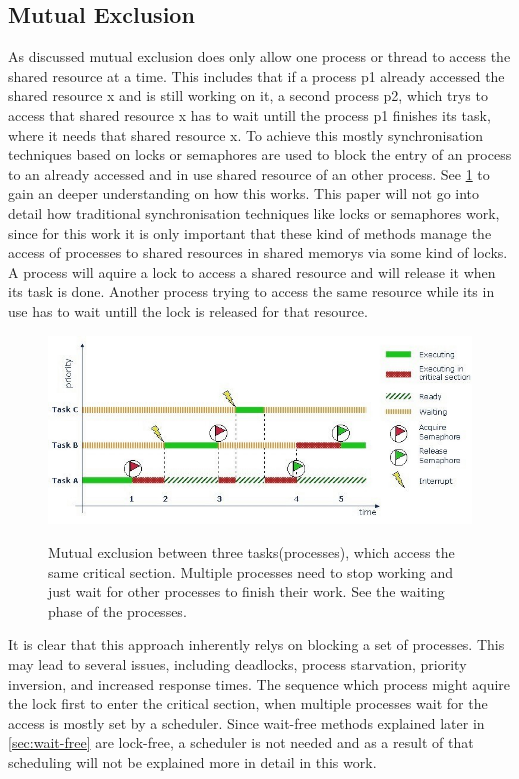 \subsection{Mutual Exclusion}\label{subsec:mutual-exclusion}

As discussed mutual exclusion does only allow one process or thread to access the shared resource at a time. This includes that if a process p1 already accessed the shared resource x and is still working on it, a second process p2, which trys to access that shared resource x has to wait untill the process p1 finishes its task, where it needs that shared resource x. To achieve this mostly synchronisation techniques based on locks or semaphores are used to block the entry of an process to an already accessed and in use shared resource of an other process. See \cref{fig:mutual-exclusion} to gain an deeper understanding on how this works. This paper will not go into detail how traditional synchronisation techniques like locks or semaphores work, since for this work it is only important that these kind of methods manage the access of processes to shared resources in shared memorys via some kind of locks. A process will aquire a lock to access a shared resource and will release it when its task is done. Another process trying to access the same resource while its in use has to wait untill the lock is released for that resource.

\begin{figure}[!ht]
   \centering
   \captionsetup{justification=centering}
   \caption{Mutual exclusion between three tasks(processes), which access the same critical section. Multiple processes need to stop working and just wait for other processes to finish their work. See the waiting phase of the processes.}
   \includegraphics[width=135mm]{images/mutual_exclusion.jpg}
   \cite{MutualExclusion}
   \label{fig:mutual-exclusion}
\end{figure}

It is clear that this approach inherently relys on blocking a set of processes. This may lead to several issues, including deadlocks, process starvation, priority inversion, and increased response times. The sequence which process might aquire the lock first to enter the critical section, when multiple processes wait for the access is mostly set by a scheduler. Since wait-free methods explained later in \cref{sec:wait-free} are lock-free, a scheduler is not needed and as a result of that scheduling will not be explained more in detail in this work. \cite{brandenburg2019multiprocessorrealtimelockingprotocols,MutexSemaphoreIPC}

